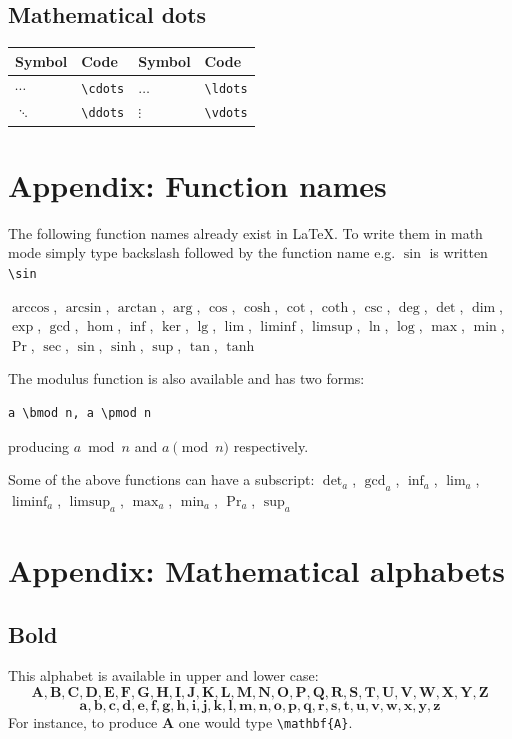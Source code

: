 \documentclass[a4paper,14pt]{extarticle}
\begin{document}
\subsection{Mathematical dots}

\begin{center}
\begin{tabular}{|p{}p{}|p{}p{}|}
\hline
Symbol & Code & Symbol & Code \\
\hline
\(\cdots\) & \verb=\cdots= & \(\ldots\) & \verb=\ldots= \\
\(\ddots\) & \verb=\ddots= & \(\vdots\) & \verb=\vdots= \\
\hline
\end{tabular}
\end{center}

\section{Appendix: Function names}

The following function names already exist in \LaTeX. To write them in math mode simply type backslash followed by the function name e.g. \(\sin\) is written \verb=\sin=

\(\arccos\), \(\arcsin\), \(\arctan\), \(\arg\), \(\cos\), \(\cosh\), \(\cot\), \(\coth\), \(\csc\), \(\deg\), \(\det\), \(\dim\), \(\exp\), \(\gcd\), \(\hom\), \(\inf\), \(\ker\), \(\lg\), \(\lim\), \(\liminf\), \(\limsup\), \(\ln\), \(\log\), \(\max\), \(\min\), \(\Pr\), \(\sec\), \(\sin\), \(\sinh\), \(\sup\), \(\tan\), \(\tanh\)

The modulus function is also available and has two forms: 
\begin{verbatim}
a \bmod n, a \pmod n 
\end{verbatim}
producing \(a \bmod n\) and \(a \pmod n\) respectively. 

Some of the above functions can have a subscript: \(\det_{a}\), \(\gcd_{a}\), \(\inf_{a}\), \(\lim_{a}\), \(\liminf_{a}\), \(\limsup_{a}\), \(\max_{a}\), \(\min_{a}\), \(\Pr_{a}\), \(\sup_{a}\)

\section{Appendix: Mathematical alphabets}

\subsection{Bold}
This alphabet is available in upper and lower case:
\begin{equation*}
\mathbf{A, B, C, D, E, F, G, H, I, J, K, L, M, N, O, P, Q, R, S, T, U, V, W, X, Y, Z}
\end{equation*}
\begin{equation*}
\mathbf{a, b, c, d, e, f, g, h, i, j, k, l, m, n, o, p, q, r, s, t, u, v, w, x, y, z}
\end{equation*}
For instance, to produce \(\mathbf{A}\) one would type \verb=\mathbf{A}=.
\end{document}
